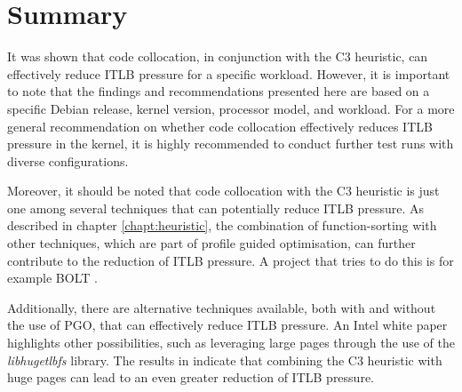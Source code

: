 \chapter{Summary}\label{chapt:summary}

It was shown that code collocation, in conjunction with the C3 heuristic, can effectively reduce ITLB pressure for a specific workload. However, it is important to note that the findings and recommendations presented here are based on a specific Debian release, kernel version, processor model, and workload. For a more general recommendation on whether code collocation effectively reduces ITLB pressure in the kernel, it is highly recommended to conduct further test runs with diverse configurations.

Moreover, it should be noted that code collocation with the C3 heuristic is just one among several techniques that can potentially reduce ITLB pressure. As described in chapter \ref{chapt:heuristic},  the combination of function-sorting with other techniques, which are part of profile guided optimisation, can further contribute to the reduction of ITLB pressure. A project that tries to do this is for example BOLT \cite{llvm-bolt}.

Additionally, there are alternative techniques available, both with and without the use of PGO, that can effectively reduce ITLB pressure. An Intel white paper \cite{intel_opt_runtime} highlights other possibilities, such as leveraging large pages through the use of the \textit{libhugetlbfs} library. The results in \cite{hfsort} indicate that combining the C3 heuristic with huge pages can lead to an even greater reduction of ITLB pressure.